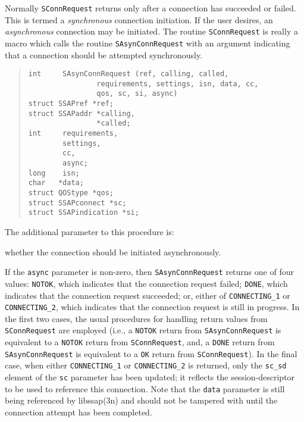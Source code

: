Normally \verb"SConnRequest" returns only after a connection has succeeded or
failed.
This is termed a {\em synchronous\/} connection initiation.
If the user desires, an {\em asynchronous\/} connection may be initiated.
The routine \verb"SConnRequest" is really a macro which calls the routine
\verb"SAsynConnRequest" with an argument indicating that a connection should
be attempted synchronously.
\begin{quote}\small\begin{verbatim}
int     SAsynConnRequest (ref, calling, called,
                requirements, settings, isn, data, cc,
                qos, sc, si, async)
struct SSAPref *ref;
struct SSAPaddr *calling,
                *called;
int     requirements,
        settings,
        cc,
        async;
long	isn;
char   *data;
struct QOStype *qos;
struct SSAPconnect *sc;
struct SSAPindication *si;
\end{verbatim}\end{quote}
The additional parameter to this procedure is:
\begin{describe}
\item[\verb"async":] whether the connection should be initiated asynchronously.
\end{describe}
If the \verb"async" parameter is non-zero,
then \verb"SAsynConnRequest" returns one of four values:
\verb"NOTOK", which indicates that the connection request failed;
\verb"DONE", which indicates that the connection request succeeded;
or, either of \verb"CONNECTING_1" or \verb"CONNECTING_2", which indicates that
the connection request is still in
progress.
In the first two cases,
the usual procedures for handling return values from \verb"SConnRequest" are
employed
(i.e., a \verb"NOTOK" return from \verb"SAsynConnRequest" is equivalent to a
\verb"NOTOK" return from \verb"SConnRequest", and,
a \verb"DONE" return from \verb"SAsynConnRequest" is equivalent to a
\verb"OK" return from \verb"SConnRequest").
In the final case, when either \verb"CONNECTING_1" or
\verb"CONNECTING_2" is returned,
only the \verb"sc_sd" element of the \verb"sc" parameter has been updated;
it reflects the session-descriptor to be used to reference this connection.
Note that the \verb"data" parameter is still being referenced by
\man libssap(3n) and should not be tampered with until the connection attempt
has been completed.

